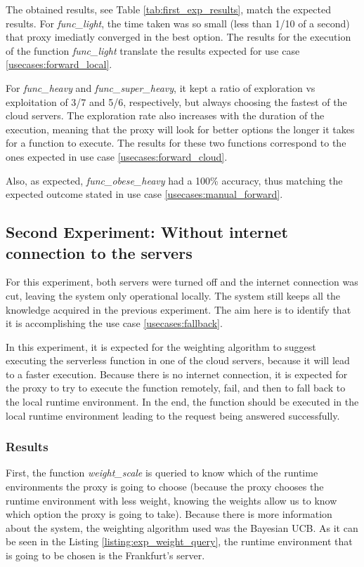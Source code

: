 The obtained results, see Table \ref{tab:first_exp_results}, match the expected
results. For \textit{func\_light}, the time taken was so small (less than 1/10 of
a second) that proxy imediatly converged in the best option. The results for the
execution of the function \textit{func\_light} translate the results expected for
use case \ref{usecases:forward_local}.

For \textit{func\_heavy} and \textit{func\_super\_heavy}, it kept a ratio of
exploration vs exploitation of 3/7 and 5/6, respectively, but always choosing the
fastest of the cloud servers. The exploration rate also increases with the
duration of the execution, meaning that the proxy will look for better options the
longer it takes for a function to execute. The results for these two functions
correspond to the ones expected in use case \ref{usecases:forward_cloud}.

Also, as expected, \textit{func\_obese\_heavy} had a 100\% accuracy, thus matching
the expected outcome stated in use case \ref{usecases:manual_forward}.

\subsection{Second Experiment: Without internet connection to the servers}
For this experiment, both servers were turned off and the internet connection was
cut, leaving the system only operational locally. The system still keeps all the
knowledge acquired in the previous experiment.
The aim here is to identify that it is accomplishing the use case
\ref{usecases:fallback}.

In this experiment, it is expected for the weighting algorithm to suggest
executing the serverless function in one of the cloud servers, because it will
lead to a faster execution. Because there is no internet connection, it is
expected for the proxy to try to execute the function remotely, fail, and then to
fall back to the local runtime environment. In the end, the function should be
executed in the local runtime environment leading to the request being answered
successfully.

\subsubsection{Results}
First, the function \textit{weight\_scale} is queried to know which of the runtime
environments the proxy is going to choose (because the proxy chooses the runtime environment with less weight, knowing the weights allow us to know which option
the proxy is going to take). Because there is more information about the system,
the weighting algorithm used was the Bayesian UCB. As it can be seen in the Listing
\ref{listing:exp_weight_query}, the runtime environment that is going to be
chosen is the Frankfurt's server.

